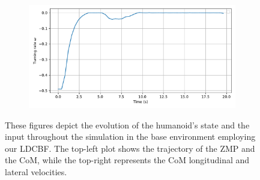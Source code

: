 \begin{figure}[H]
\begin{subfigure}{0.45\linewidth}
    \end{subfigure}
    \begin{subfigure}{0.45\linewidth}
        \centering
        \includegraphics[width=\linewidth]{figures/Simulations/sim1circles/evolution_3.pdf}
    \end{subfigure}
    \caption{These figures depict the evolution of the humanoid's state and the input throughout the simulation in the base environment employing our LDCBF. The top-left plot shows the trajectory of the ZMP and the CoM, while the top-right represents the CoM longitudinal and lateral velocities.}
    \label{fig:sim1_evol}
\end{figure}

